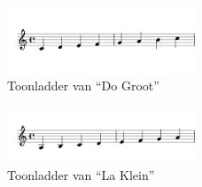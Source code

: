 \begin{figure}[!ht]
  \centering
  \includegraphics[width=0.5\textwidth]{1_Muzikale_Achtergrond/do_groot}
  \caption{Toonladder van ``Do Groot''}
  \label{figuur:do_groot}
\end{figure}

\begin{figure}[!ht]
  \centering
  \includegraphics[width=0.5\textwidth]{1_Muzikale_Achtergrond/la_klein}
  \caption{Toonladder van ``La Klein''}
  \label{figuur:la_klein}
\end{figure}

